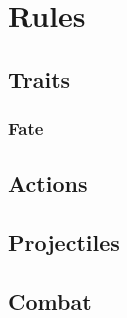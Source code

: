 \section{Rules}

\physicalSkillChart

\begin{multicols}{2}

\subsection*{Traits}





\subsubsection*{Fate}


\subsubsection*{}




\mentalSkillChart

\subsection*{Actions}








\subsection*{Projectiles}



\subsection*{Combat}





\commonWeaponsChart


\end{multicols}
